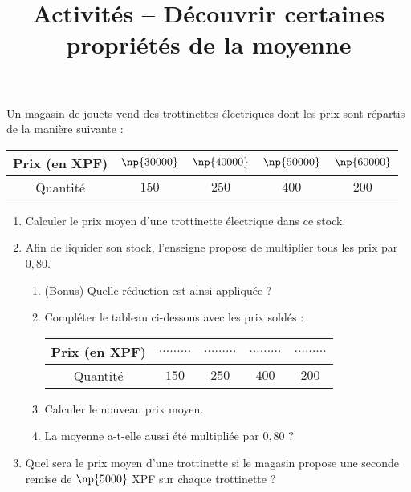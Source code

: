 \documentclass[a4paper]{article}
\begin{document}
\title{Activités -- Découvrir certaines propriétés de la moyenne}

\pagestyle{empty}

\date{}
\author{}

\maketitle{}

Un magasin de jouets vend des trottinettes électriques dont les prix sont répartis de la manière suivante :

\begin{center}
  \begin{tabular}{@{}ccccc@{}}
    \toprule
    Prix (en XPF) & $\np{30000}$ & $\np{40000}$ & $\np{50000}$ & $\np{60000}$\\
    \midrule
    Quantité & $150$ & $250$ & $400$ & $200$\\
    \bottomrule
  \end{tabular}
\end{center}

\begin{enumerate}
  \item Calculer le prix moyen d'une trottinette électrique dans ce stock.
  \item Afin de liquider son stock, l'enseigne propose de multiplier tous les prix par $0,80$.
    \begin{enumerate}
      \item (Bonus) Quelle réduction est ainsi appliquée ?
      \item Compléter le tableau ci-dessous avec les prix soldés :

	\begin{center}
	  \begin{tabular}{@{}ccccc@{}}
	    \toprule
	    Prix (en XPF) & $\hdots\hdots\hdots$ & $\hdots\hdots\hdots$ & $\hdots\hdots\hdots$ & $\hdots\hdots\hdots$\\
	    \midrule
	    Quantité & $150$ & $250$ & $400$ & $200$\\
	    \bottomrule
	  \end{tabular}
	\end{center}
      \item Calculer le nouveau prix moyen.
      \item La moyenne a-t-elle aussi été multipliée par $0,80$ ?
    \end{enumerate}
  \item Quel sera le prix moyen d'une trottinette si le magasin propose une seconde remise de $\np{5000}$ XPF sur chaque trottinette ?
\end{enumerate}
\end{document}
